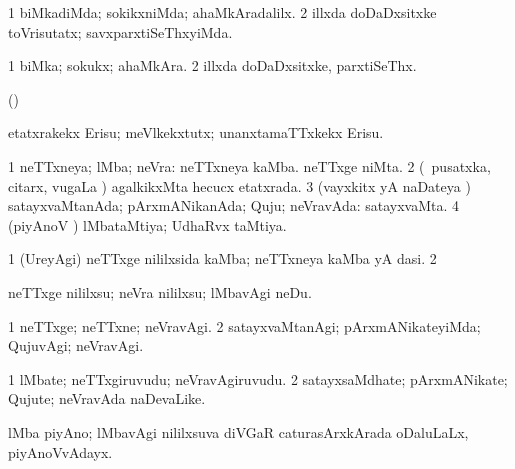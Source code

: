 {{\bentry
{}
\gl{\kirxvi}
\bmng
\bnum
\num{1} biMkadiMda; sokikxniMda; ahaMkAradalilx. 
\num{2} illxda doDaDxsitxke toVrisutatx; savxparxtiSeThxyiMda. 
\enum
\emng
\eentry

\bentry
{} 
\gl{\nA}
\expl{}
\bmng
\bnum
\num{1} biMka; sokukx; ahaMkAra. 
\num{2} illxda doDaDxsitxke, parxtiSeThx. 
\enum
\emng
\eentry

\bentry
{} 
\gl{\gu}
\expl{}
\bmng
(\AmA)  
\emng
\eentry

\bentry
{} 
\gl{\sakirx}
\expl{}
\bmng
etatxrakekx Erisu; meVlkekxtutx; unanxtamaTTxkekx Erisu. 
\emng
\eentry

\bentry
{} 
\gl{\gu}
\expl{}
\bmng
\bnum
\num{1} neTTxneya; lMba; neVra:  neTTxneya kaMba.  neTTxge niMta. 
\num{2} (\kanmu\ pusatxka, citarx, \mo vugaLa \vi) agalkikxMta hecucx etatxrada. 
\num{3} (vayxkitx yA naDateya \vi) satayxvaMtanAda; pArxmANikanAda; Quju; neVravAda:  satayxvaMta. 
\num{4} (piyAnoV \vi) lMbataMtiya; UdhaRvx taMtiya. 
\enum
\emng
\eentry

\bentry
{} 
\gl{\nA}
\expl{}
\bmng
\bnum
\num{1} (UreyAgi) neTTxge nililxsida kaMba; neTTxneya kaMba yA dasi. 
\num{2}  
\enum
\emng
\eentry

\bentry
{} 
\gl{\kirxvi}
\expl{}
\bmng
{} 
\emng
\eentry

\bentry
{} 
\gl{\sakirx}
\expl{}
\bmng
neTTxge nililxsu; neVra nililxsu; lMbavAgi neDu. 
\emng
\eentry

\bentry
{} 
\gl{\kirxvi}
\expl{}
\bmng
\bnum
\num{1} neTTxge; neTTxne; neVravAgi. 
\num{2} satayxvaMtanAgi; pArxmANikateyiMda; QujuvAgi; neVravAgi. 
\enum
\emng
\eentry

\bentry
{} 
\gl{\nA}
\expl{}
\bmng
\bnum
\num{1} lMbate; neTTxgiruvudu; neVravAgiruvudu. 
\num{2} satayxsaMdhate; pArxmANikate; Qujute; neVravAda naDevaLike. 
\enum
\emng
\eentry

\bentry
{}
\gl{\nA}
\expl{}
\bmng
lMba piyAno; lMbavAgi nililxsuva diVGaR caturasArxkArada oDaluLaLx, piyAnoVvAdayx. 
\emng
\eentry

}}
